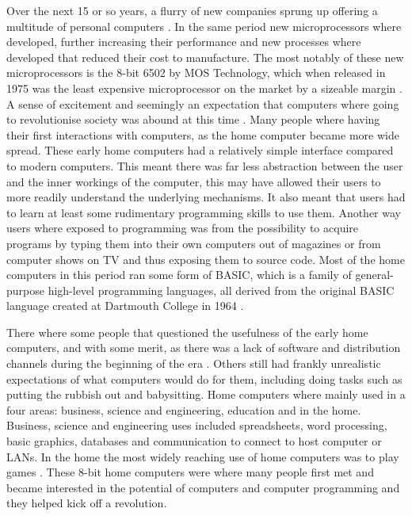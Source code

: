 Over the next 15 or so years, a flurry of new companies sprung up offering a multitude of personal computers 
\cite{RN27}. In the same period new microprocessors where developed, further increasing their performance and new processes where developed that reduced their cost to manufacture. The most notably of these new microprocessors is the 8-bit 6502 by MOS Technology, which when released in 1975 was the least expensive microprocessor on the market by a sizeable margin 
\cite{RN40}. A sense of excitement and seemingly an expectation that computers where going to revolutionise society was abound at this time 
\cite{RN34}. Many people where having their first interactions with computers, as the home computer became more wide spread. These early home computers had a relatively simple interface compared to modern computers. This meant there was far less abstraction between the user and the inner workings of the computer, this may have allowed their users to more readily understand the underlying mechanisms. It also meant that users had to learn at least some rudimentary programming skills to use them. Another way users where exposed to programming was from the possibility to acquire programs by typing them into their own computers out of magazines or from computer shows on TV and thus exposing them to source code. Most of the home computers in this period ran some form of BASIC, which is a family of general-purpose high-level programming languages, all derived from the original BASIC language created at Dartmouth College in 1964
\cite{RN130}. 

There where some people that questioned the usefulness of the early home computers, and with some merit, as there was a lack of software and distribution channels during the beginning of the era
\cite{RN23}. Others still had frankly unrealistic expectations of what computers would do for them, including doing tasks such as putting the rubbish out and babysitting. Home computers where mainly used in a four areas: business, science and engineering, education and in the home. Business, science and engineering uses included spreadsheets, word processing, basic graphics, databases and communication to connect to host computer or LANs. In the home the most widely reaching use of home computers was to play games 
\cite{RN24}. These 8-bit home computers were where many people first met and became interested in the potential of computers and computer programming and they helped kick off a revolution.


